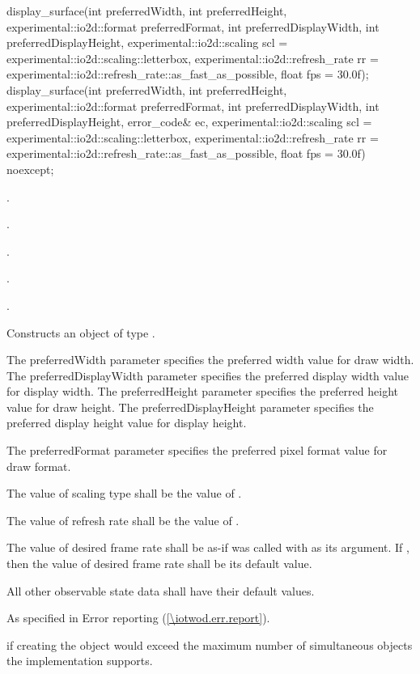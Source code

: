 \begin{itemdecl}
display_surface(int preferredWidth, int preferredHeight, 
  experimental::io2d::format preferredFormat,
  int preferredDisplayWidth, int preferredDisplayHeight,
  experimental::io2d::scaling scl = experimental::io2d::scaling::letterbox,
    experimental::io2d::refresh_rate rr =
    experimental::io2d::refresh_rate::as_fast_as_possible, float fps = 30.0f);
display_surface(int preferredWidth, int preferredHeight, 
  experimental::io2d::format preferredFormat,
  int preferredDisplayWidth, int preferredDisplayHeight, error_code& ec,
  experimental::io2d::scaling scl = experimental::io2d::scaling::letterbox,
    experimental::io2d::refresh_rate rr =
    experimental::io2d::refresh_rate::as_fast_as_possible, float fps = 30.0f) 
  noexcept;
\end{itemdecl}
\begin{itemdescr}
\pnum
\requires
{}.

\pnum
{}.

\pnum
{}.

\pnum
{}.

\pnum
{}.

\pnum
\effects
Constructs an object of type .

\pnum
The preferredWidth parameter specifies the preferred width value for draw width. The preferredDisplayWidth parameter specifies the preferred display width value for display width. The preferredHeight parameter specifies the preferred height value for draw height. The preferredDisplayHeight parameter specifies the preferred display height value for display height.

\pnum
The preferredFormat parameter specifies the preferred pixel format value for draw format.

\pnum
The value of scaling type shall be the value of .

\pnum
The value of refresh rate shall be the value of .

\pnum
The value of desired frame rate shall be as-if  was called with  as its argument. If , then the value of desired frame rate shall be its default value.

\pnum
All other observable state data shall have their default values.

\pnum
\throws
As specified in Error reporting (\ref{\iotwod.err.report}).

\pnum
\errors
{} if creating the  object would exceed the maximum number of simultaneous  objects the implementation supports.
\end{itemdescr}

